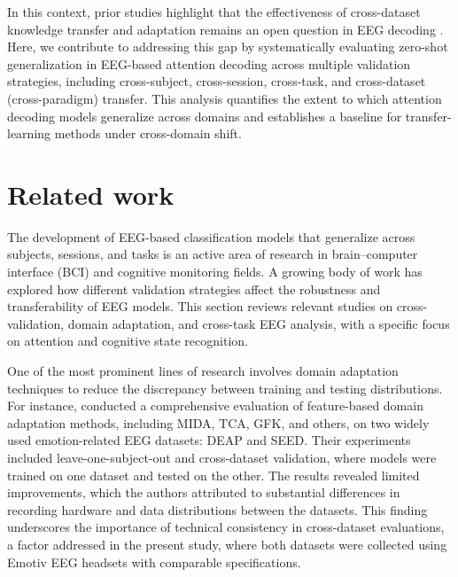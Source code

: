 \documentclass[utf8]{FrontiersinHarvard} %
\begin{document}
In this context, prior studies highlight that the effectiveness of cross-dataset knowledge transfer and adaptation remains an open question in EEG decoding \citep{Lan2019DomainAdaptationEEG}. Here, we contribute to addressing this gap by systematically evaluating zero-shot generalization in EEG-based attention decoding across multiple validation strategies, including cross-subject, cross-session, cross-task, and cross-dataset (cross-paradigm) transfer. This analysis quantifies the extent to which attention decoding models generalize across domains and establishes a baseline for transfer-learning methods under cross-domain shift.

\section{Related work}
The development of EEG-based classification models that generalize across subjects, sessions, and tasks is an active area of research in brain--computer interface (BCI) and cognitive monitoring fields. A growing body of work has explored how different validation strategies affect the robustness and transferability of EEG models. This section reviews relevant studies on cross-validation, domain adaptation, and cross-task EEG analysis, with a specific focus on attention and cognitive state recognition.

One of the most prominent lines of research involves domain adaptation techniques to reduce the discrepancy between training and testing distributions. For instance, \cite{Lan2019DomainAdaptationEEG} conducted a comprehensive evaluation of feature-based domain adaptation methods, including MIDA, TCA, GFK, and others, on two widely used emotion-related EEG datasets: DEAP and SEED. Their experiments included leave-one-subject-out and cross-dataset validation, where models were trained on one dataset and tested on the other. The results revealed limited improvements, which the authors attributed to substantial differences in recording hardware and data distributions between the datasets. This finding underscores the importance of technical consistency in cross-dataset evaluations, a factor addressed in the present study, where both datasets were collected using Emotiv EEG headsets with comparable specifications.
\end{document}
